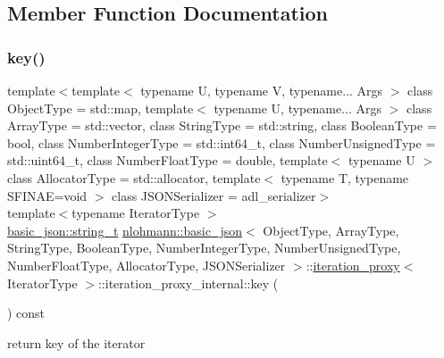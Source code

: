 \subsection{Member Function Documentation}
\mbox{\label{classnlohmann_1_1basic__json_1_1iteration__proxy_1_1iteration__proxy__internal_abe2efa90ad735148537144a043a58f97}} 
\subsubsection{\texorpdfstring{key()}{key()}}
{\footnotesize\ttfamily template$<$template$<$ typename U, typename V, typename... Args $>$ class Object\+Type = std\+::map, template$<$ typename U, typename... Args $>$ class Array\+Type = std\+::vector, class String\+Type  = std\+::string, class Boolean\+Type  = bool, class Number\+Integer\+Type  = std\+::int64\+\_\+t, class Number\+Unsigned\+Type  = std\+::uint64\+\_\+t, class Number\+Float\+Type  = double, template$<$ typename U $>$ class Allocator\+Type = std\+::allocator, template$<$ typename T, typename S\+F\+I\+N\+A\+E=void $>$ class J\+S\+O\+N\+Serializer = adl\+\_\+serializer$>$ \\
template$<$typename Iterator\+Type $>$ \\
\hyperlink{classnlohmann_1_1basic__json_a61f8566a1a85a424c7266fb531dca005}{basic\+\_\+json\+::string\+\_\+t} \hyperlink{classnlohmann_1_1basic__json}{nlohmann\+::basic\+\_\+json}$<$ Object\+Type, Array\+Type, String\+Type, Boolean\+Type, Number\+Integer\+Type, Number\+Unsigned\+Type, Number\+Float\+Type, Allocator\+Type, J\+S\+O\+N\+Serializer $>$\+::\hyperlink{classnlohmann_1_1basic__json_1_1iteration__proxy}{iteration\+\_\+proxy}$<$ Iterator\+Type $>$\+::iteration\+\_\+proxy\+\_\+internal\+::key (\begin{DoxyParamCaption}{ }\end{DoxyParamCaption}) const\hspace{0.3cm}{\ttfamily [inline]}}



return key of the iterator 

